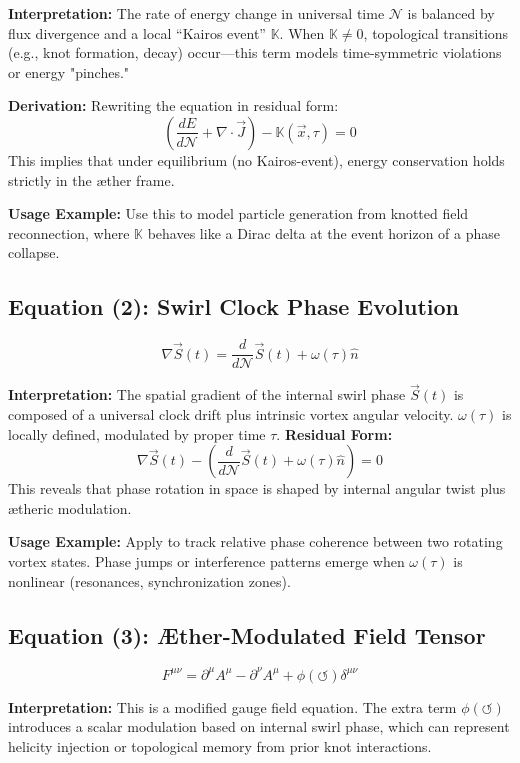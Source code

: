 \documentclass[12pt]{article}
\begin{document}
\textbf{Interpretation:} The rate of energy change in universal time $\mathcal{N}$ is balanced by flux divergence and a local ``Kairos event'' $\mathbb{K}$. When $\mathbb{K} \neq 0$, topological transitions (e.g., knot formation, decay) occur—this term models time-symmetric violations or energy "pinches."

\textbf{Derivation:} Rewriting the equation in residual form:
\[
\left( \frac{dE}{d\mathcal{N}} + \nabla \cdot \vec{J} \right) - \mathbb{K}(\vec{x}, \tau) = 0
\]
This implies that under equilibrium (no Kairos-event), energy conservation holds strictly in the æther frame.


\textbf{Usage Example:} Use this to model particle generation from knotted field reconnection, where $\mathbb{K}$ behaves like a Dirac delta at the event horizon of a phase collapse.

\subsection*{Equation (2): Swirl Clock Phase Evolution}
\[
\nabla \vec{S}(t) = \frac{d}{d\mathcal{N}} \vec{S}(t) + \omega(\tau) \hat{n}
\]

\textbf{Interpretation:} The spatial gradient of the internal swirl phase $\vec{S}(t)$ is composed of a universal clock drift plus intrinsic vortex angular velocity. $\omega(\tau)$ is locally defined, modulated by proper time $\tau$.
\textbf{Residual Form:}
\[
\nabla \vec{S}(t) - \left( \frac{d}{d\mathcal{N}} \vec{S}(t) + \omega(\tau) \hat{n} \right) = 0
\]
This reveals that phase rotation in space is shaped by internal angular twist plus ætheric modulation.

\textbf{Usage Example:} Apply to track relative phase coherence between two rotating vortex states. Phase jumps or interference patterns emerge when $\omega(\tau)$ is nonlinear (resonances, synchronization zones).

\subsection*{Equation (3): Æther-Modulated Field Tensor}
\[
F^{\mu\nu} = \partial^\mu A^\mu - \partial^\nu A^\mu + \phi(\circlearrowleft) \delta^{\mu\nu}
\]

\textbf{Interpretation:} This is a modified gauge field equation. The extra term $\phi(\circlearrowleft)$ introduces a scalar modulation based on internal swirl phase, which can represent helicity injection or topological memory from prior knot interactions.
\end{document}
